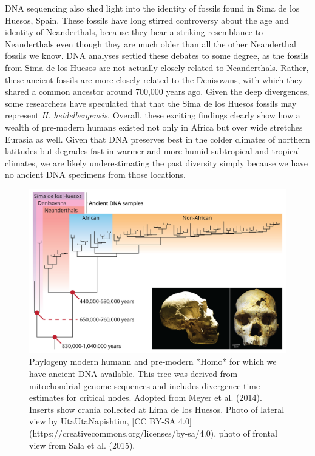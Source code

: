 \documentclass[
]{book}
\begin{document}
DNA sequencing also shed light into the identity of fossils found in Sima de los Huesos, Spain. These fossils have long stirred controversy about the age and identity of Neanderthals, because they bear a striking resemblance to Neanderthals even though they are much older than all the other Neanderthal fossils we know. DNA analyses settled these debates to some degree, as the fossils from Sima de los Huesos are not actually closely related to Neanderthals. Rather, these ancient fossils are more closely related to the Denisovans, with which they shared a common ancestor around 700,000 years ago. Given the deep divergences, some researchers have speculated that that the Sima de los Huesos fossils may represent \emph{H. heidelbergensis}. Overall, these exciting findings clearly show how a wealth of pre-modern humans existed not only in Africa but over wide stretches Eurasia as well. Given that DNA preserves best in the colder climates of northern latitudes but degrades fast in warmer and more humid subtropical and tropical climates, we are likely underestimating the past diversity simply because we have no ancient DNA specimens from those locations.

\begin{figure}
\includegraphics[width=1\linewidth]{images/ancientdnaphylo} \caption{Phylogeny modern humann and pre-modern *Homo* for which we have ancient DNA available. This tree was derived from mitochondrial genome sequences and includes divergence time estimates for critical nodes. Adopted from Meyer et al. (2014). Inserts show crania collected at Lima de los Huesos. Photo of lateral view by UtaUtaNapishtim, [CC BY-SA 4.0](https://creativecommons.org/licenses/by-sa/4.0), photo of frontal view from Sala et al. (2015). }\label{fig:ancientphylo}
\end{figure}
\end{document}
